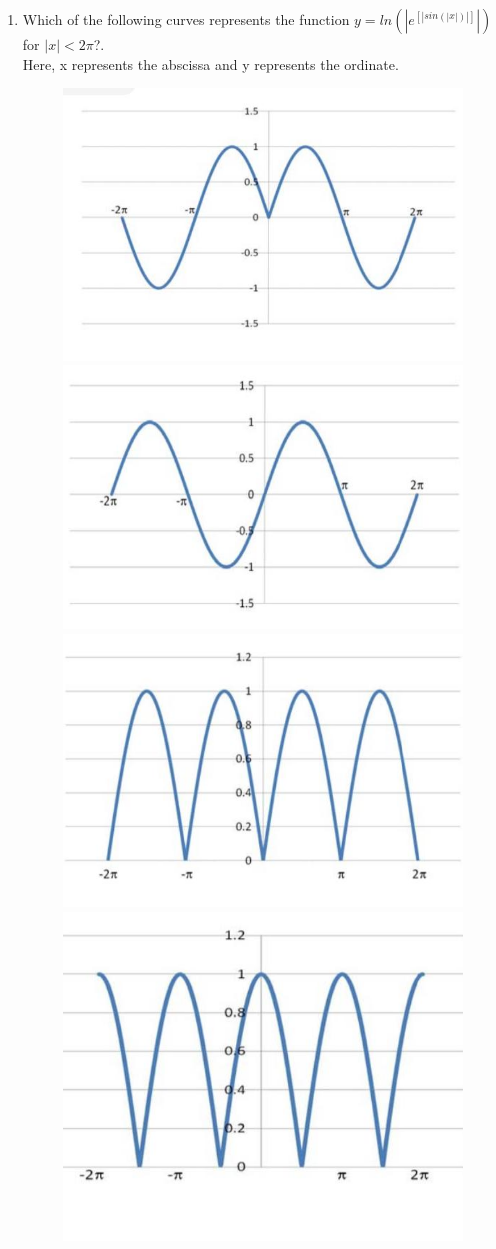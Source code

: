 \documentclass[journal,12pt,onecolumn]{IEEEtran}
\theoremstyle{remark}
\begin{document}
\begin{enumerate}
\item Which of the following curves represents the function $y=ln(|e^{[|sin(|x|)|]}|)$ for $|x|<2\pi$?.\\Here, x represents the abscissa and y represents the ordinate.
\begin{figure}[H]
    \centering
 \begin{multicols}{2}
\includegraphics[width=0.7\columnwidth]{figs_2/fig_2.10.1.jpeg}
\includegraphics[width=0.7\columnwidth]{figs_2/fig_2.10.2.jpeg}
\includegraphics[width=0.7\columnwidth]{figs_2/fig_2.10.3.jpeg} 
\includegraphics[width=0.7\columnwidth]{figs_2/fig_2.10.4.jpeg}

\end{multicols}
\end{figure}
\end{enumerate}
\end{document}
